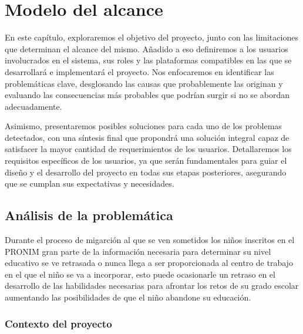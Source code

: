 
\chapter{Modelo del alcance}
\label{cap:alcance}

	En este capítulo, exploraremos el objetivo del proyecto, junto con las limitaciones que determinan el alcance del mismo. Añadido a eso definiremos a los usuarios involucrados en el sistema, sus roles y las plataformas compatibles en las que se desarrollará e implementará el proyecto. Nos enfocaremos en identificar las problemáticas clave, desglosando las causas que probablemente las originan y evaluando las consecuencias más probables que podrían surgir si no se abordan adecuadamente.

Asimismo, presentaremos posibles soluciones para cada uno de los problemas detectados, con una síntesis final que propondrá una solución integral capaz de satisfacer la mayor cantidad de requerimientos de los usuarios. Detallaremos los requisitos específicos de los usuarios, ya que serán fundamentales para guiar el diseño y el desarrollo del proyecto en todas sus etapas posteriores, asegurando que se cumplan sus expectativas y necesidades.
\section{Análisis de la problemática}

Durante el proceso de migarción al que se ven sometidos los niños inscritos en el PRONIM gran parte de la información necesaria para determinar su nivel educativo se ve retrasada o nunca llega a ser proporcionada al centro de trabajo en el que el niño se va  a incorporar, esto puede ocasionarle un retraso en el desarrollo de las habilidades necesarias para afrontar los retos de su grado escolar aumentando las posibilidades de que el niño abandone su educación.
\subsection{Contexto del proyecto}

